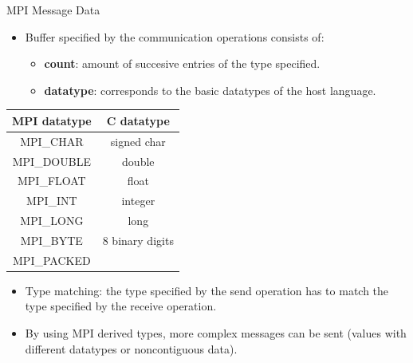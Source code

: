 \begin{frame}[fragile]{MPI Message Data}
    \begin{itemize}
        \item Buffer specified by the  communication operations consists of:
            \begin{itemize}
            \item \textbf{count}: amount of succesive entries of the type specified. 
            \item \textbf{datatype}: corresponds to the basic datatypes of the host language.
            \end{itemize}
    \end{itemize}


\begin{center}
 \scriptsize\begin{tabular}{||c c||} 
 \hline
 MPI datatype & C datatype \\ [0.5ex] 
 \hline\hline
 MPI\_CHAR & signed char\\ 
 \hline
 MPI\_DOUBLE & double\\
 \hline
 MPI\_FLOAT & float  \\
 \hline
 MPI\_INT & integer  \\
 \hline
 MPI\_LONG & long  \\
 \hline
 MPI\_BYTE &  8 binary digits \\
 \hline
 MPI\_PACKED & \\ [1ex] 
 \hline
\end{tabular}
\normalsize
\end{center}

\begin{itemize}
        \item Type matching: the type specified by the send operation has to match the type specified by the
                receive operation.
        \item By using MPI derived types, more complex messages can be sent (values with different datatypes or  noncontiguous data). 
\end{itemize}
\end{frame}

